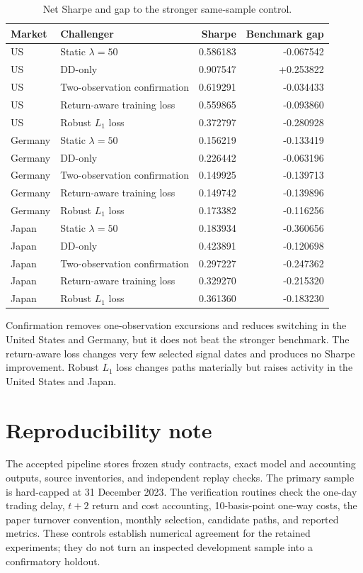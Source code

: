 \documentclass[11pt]{article}
\begin{document}
\begin{table}[H]
\centering
\caption{Net Sharpe and gap to the stronger same-sample control.}
\label{tab:suite}
\small
\begin{tabular}{llrr}
\toprule
Market & Challenger & Sharpe & Benchmark gap \\
\midrule
US & Static $\lambda=50$ & 0.586183 & -0.067542 \\
US & DD-only & 0.907547 & +0.253822 \\
US & Two-observation confirmation & 0.619291 & -0.034433 \\
US & Return-aware training loss & 0.559865 & -0.093860 \\
US & Robust $L_1$ loss & 0.372797 & -0.280928 \\
\addlinespace
Germany & Static $\lambda=50$ & 0.156219 & -0.133419 \\
Germany & DD-only & 0.226442 & -0.063196 \\
Germany & Two-observation confirmation & 0.149925 & -0.139713 \\
Germany & Return-aware training loss & 0.149742 & -0.139896 \\
Germany & Robust $L_1$ loss & 0.173382 & -0.116256 \\
\addlinespace
Japan & Static $\lambda=50$ & 0.183934 & -0.360656 \\
Japan & DD-only & 0.423891 & -0.120698 \\
Japan & Two-observation confirmation & 0.297227 & -0.247362 \\
Japan & Return-aware training loss & 0.329270 & -0.215320 \\
Japan & Robust $L_1$ loss & 0.361360 & -0.183230 \\
\bottomrule
\end{tabular}
\end{table}

Confirmation removes one-observation excursions and reduces switching in the United States and Germany, but it does not beat the stronger benchmark. The return-aware loss changes very few selected signal dates and produces no Sharpe improvement. Robust $L_1$ loss changes paths materially but raises activity in the United States and Japan.

\section{Reproducibility note}

The accepted pipeline stores frozen study contracts, exact model and accounting outputs, source inventories, and independent replay checks. The primary sample is hard-capped at 31 December 2023. The verification routines check the one-day trading delay, $t+2$ return and cost accounting, 10-basis-point one-way costs, the paper turnover convention, monthly selection, candidate paths, and reported metrics. These controls establish numerical agreement for the retained experiments; they do not turn an inspected development sample into a confirmatory holdout.
\end{document}

